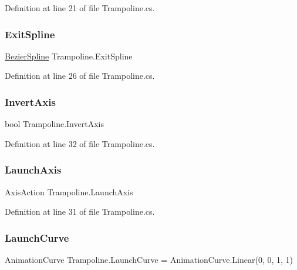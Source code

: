 Definition at line 21 of file Trampoline.\+cs.

\mbox{\label{class_trampoline_aea8073d79b9f7ba4a0ffd874d75ff0b3}} 
\subsubsection{\texorpdfstring{Exit\+Spline}{ExitSpline}}
{\footnotesize\ttfamily \mbox{\hyperlink{class_bezier_spline}{Bezier\+Spline}} Trampoline.\+Exit\+Spline}



Definition at line 26 of file Trampoline.\+cs.

\mbox{\label{class_trampoline_ae47591befb521f0821ad4caae5edd492}} 
\subsubsection{\texorpdfstring{Invert\+Axis}{InvertAxis}}
{\footnotesize\ttfamily bool Trampoline.\+Invert\+Axis}



Definition at line 32 of file Trampoline.\+cs.

\mbox{\label{class_trampoline_ac7db8dd743a2cfbf7224d611eef4bad2}} 
\subsubsection{\texorpdfstring{Launch\+Axis}{LaunchAxis}}
{\footnotesize\ttfamily Axis\+Action Trampoline.\+Launch\+Axis}



Definition at line 31 of file Trampoline.\+cs.

\mbox{\label{class_trampoline_ac0d0e4d0f6f1e52ac36235c4a35dd28d}} 
\subsubsection{\texorpdfstring{Launch\+Curve}{LaunchCurve}}
{\footnotesize\ttfamily Animation\+Curve Trampoline.\+Launch\+Curve = Animation\+Curve.\+Linear(0, 0, 1, 1)}



